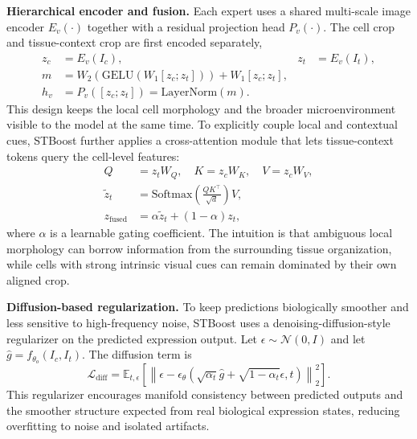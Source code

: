 \documentclass{article}
\begin{document}
\noindent\textbf{Hierarchical encoder and fusion.}
Each expert uses a shared multi-scale image encoder $E_v(\cdot)$ together with a residual projection head $P_v(\cdot)$. The cell crop and tissue-context crop are first encoded separately,
\begin{align}
z_c &= E_v(I_c), & z_t &= E_v(I_t), \\
m &= W_2(\mathrm{GELU}(W_1[z_c; z_t])) + W_1[z_c; z_t], \\
h_v &= P_v([z_c; z_t]) = \mathrm{LayerNorm}(m).
\end{align}
This design keeps the local cell morphology and the broader microenvironment visible to the model at the same time. To explicitly couple local and contextual cues, STBoost further applies a cross-attention module that lets tissue-context tokens query the cell-level features:
\begin{equation}
\begin{aligned}
Q &= z_t W_Q, \quad K = z_c W_K, \quad V = z_c W_V, \\
\tilde{z}_t &= \mathrm{Softmax}\!\left(\frac{QK^\top}{\sqrt{d}}\right)V, \\
z_{\mathrm{fused}} &= \alpha \tilde{z}_t + (1-\alpha) z_t,
\end{aligned}
\end{equation}
where $\alpha$ is a learnable gating coefficient. The intuition is that ambiguous local morphology can borrow information from the surrounding tissue organization, while cells with strong intrinsic visual cues can remain dominated by their own aligned crop.

\noindent\textbf{Diffusion-based regularization.}
To keep predictions biologically smoother and less sensitive to high-frequency noise, STBoost uses a denoising-diffusion-style regularizer on the predicted expression output. Let $\epsilon\sim\mathcal{N}(0,I)$ and let $\hat{g}=f_{\theta_o}(I_c,I_t)$. The diffusion term is
\begin{equation}
\mathcal{L}_{\mathrm{diff}} =
\mathbb{E}_{t,\epsilon}\!
\left[
\left\lVert
\epsilon - \epsilon_\theta\!\left(\sqrt{\alpha_t}\hat{g}+\sqrt{1-\alpha_t}\epsilon,t\right)
\right\rVert_2^2
\right].
\end{equation}
This regularizer encourages manifold consistency between predicted outputs and the smoother structure expected from real biological expression states, reducing overfitting to noise and isolated artifacts.
\end{document}
